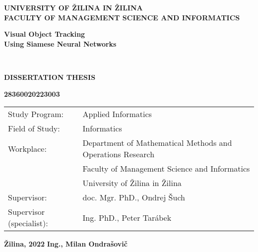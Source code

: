 \begin{titlepage}
    \begin{center}
        \normalsize
        \textbf{UNIVERSITY OF ŽILINA IN ŽILINA}\\
        \textbf{FACULTY OF MANAGEMENT SCIENCE AND INFORMATICS}\\

        \vfill

        \Large
        \textbf{Visual Object Tracking\\Using Siamese Neural Networks}

        \

        \large
        \textbf{DISSERTATION THESIS}

        \textbf{28360020223003}
    \end{center}

    \vfill

    \small

    \begin{tabular}{ll}
        Study Program:           & Applied Informatics                                        \\[-2ex]
        Field of Study:          & Informatics                                                \\[-2ex]
        Workplace:               & Department of Mathematical Methods and Operations Research \\[-2ex]
                                 & Faculty of Management Science and Informatics              \\[-2ex]
                                 & University of Žilina in Žilina                             \\[-2ex]
        Supervisor:              & doc. Mgr. PhD., Ondrej Šuch                                \\[-2ex]
        Supervisor (specialist): & Ing. PhD., Peter Tarábek                                   \\[-2ex]
    \end{tabular}

    \normalsize

    \vfill

    \textbf{Žilina, 2022} \hfill \textbf{Ing., Milan Ondrašovič}

\end{titlepage}